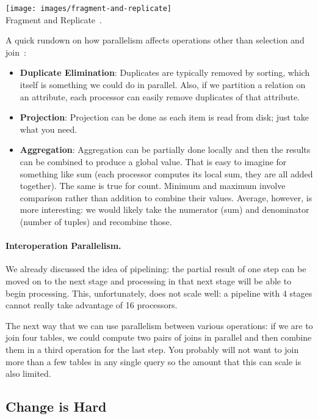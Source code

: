 \begin{center}
\texttt{[image: images/fragment-and-replicate]}\\
Fragment and Replicate~\cite{dsc}.
\end{center}

A quick rundown on how parallelism affects operations other than selection and join~\cite{dsc}:
\begin{itemize}
\item \textbf{Duplicate Elimination}: Duplicates are typically removed by sorting, which itself is something we could do in parallel. Also, if we partition a relation on an attribute, each processor can easily remove duplicates of that attribute.
\item \textbf{Projection}: Projection can be done as each item is read from disk; just take what you need.
\item \textbf{Aggregation}: Aggregation can be partially done locally and then the results can be combined to produce a global value. That is easy to imagine for something like sum (each processor computes its local sum, they are all added together). The same is true for count. Minimum and maximum involve comparison rather than addition to combine their values. Average, however, is more interesting: we would likely take the numerator (sum) and denominator (number of tuples) and recombine those.

\end{itemize}

\paragraph{Interoperation Parallelism.}

We already discussed the idea of pipelining: the partial result of one step can be moved on to the next stage and processing in that next stage will be able to begin processing. This, unfortunately, does not scale well: a pipeline with 4 stages cannot really take advantage of 16 processors.

The next way that we can use parallelism between various operations: if we are to join four tables, we could compute two pairs of joins in parallel and then combine them in a third operation for the last step. You probably will not want to join more than a few tables in any single query so the amount that this can scale is also limited.

\subsection*{Change is Hard}


